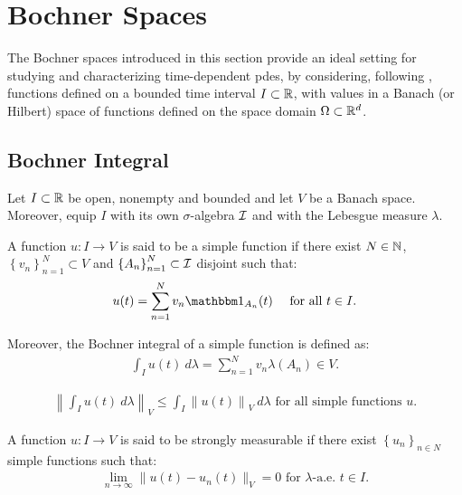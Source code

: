 \section{Bochner Spaces}

The Bochner spaces introduced in this section provide an ideal setting for studying and characterizing time-dependent \acrshort{pdes}, by considering, following \cite[p. 111]{Ern2021}, functions defined on a bounded time interval $I \subset \mathbb{R}$, with values in a Banach (or Hilbert) space of functions defined on the space domain $\Omega \subset \mathbb{R}^{d}$.

\subsection{Bochner Integral}

Let $I \subset \mathbb{R}$ be open, nonempty and bounded and let $V$ be a Banach space. Moreover, equip $I$ with its own $\sigma$-algebra $\mathcal{I}$ and with the Lebesgue measure $\lambda$.

\begin{definition}
    A function $u\colon I \rightarrow V$ is said to be a simple function if there exist $N \in \mathbb{N}$, $\left\{ v_n \right\}_{n = 1}^N \subset V$ and $\left\{ A_n \right\}_{n = 1}^N \subset \mathcal{I}$ disjoint such that:
    \begin{gather}
        u(t) = \sum_{n = 1}^N v_n \Characteristic{A_n}(t) \quad \text{ for all } t \in I.
    \end{gather}

    Moreover, the Bochner integral of a simple function is defined as:
    \begin{gather}
        \int_I u(t) ~ d \lambda  = \sum_{n = 1}^N v_n \lambda(A_n) \in V.
    \end{gather}
\end{definition}

\begin{lemma} %
    \begin{gather}
        \left\lVert \int_I u(t) ~ d \lambda \right\rVert_V \leq \int_I \left\lVert u(t) \right\rVert_V ~ d \lambda \text{ for all simple functions } u.
    \end{gather}
\end{lemma}

\begin{definition}
    A function $u\colon I \rightarrow V$ is said to be strongly measurable if there exist $\left\{ u_n \right\}_{n \in N}$ simple functions such that:
    \begin{gather}
        \lim_{n \rightarrow \infty} \lVert u(t) - u_n(t) \rVert_V = 0 \text{ for } \lambda \text{-a.e. } t \in I.
    \end{gather}
\end{definition}

